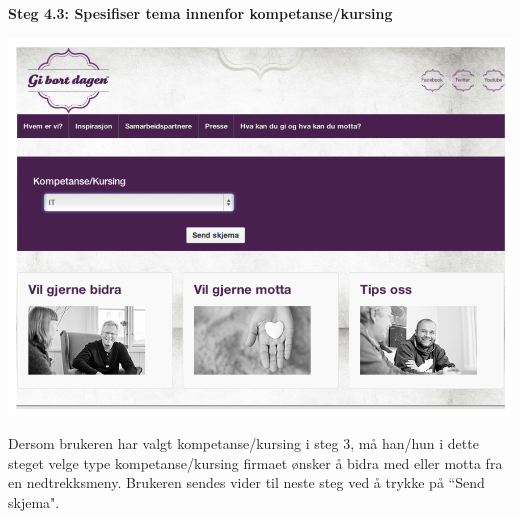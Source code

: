 \bf{Steg 4.3:} Spesifiser tema innenfor kompetanse/kursing
\begin{center}
\includegraphics[clip=true, width=1 \textwidth,
trim=0cm 0cm 0cm 0cm]{kompetanse.png}
\label{fig:kompetanse}
\end{center}

Dersom brukeren har valgt kompetanse/kursing i steg 3, må han/hun i dette steget velge type kompetanse/kursing firmaet ønsker å bidra med eller motta fra en nedtrekksmeny. Brukeren sendes vider til neste steg ved å trykke på ``Send skjema".\\

